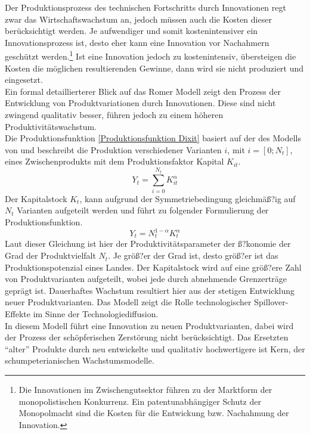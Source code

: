 Der Produktionsprozess des technischen Fortschritts durch Innovationen regt zwar das Wirtschaftswachstum an, jedoch müssen auch die Kosten dieser berücksichtigt werden. Je aufwendiger und somit kostenintensiver ein Innovationsprozess ist, desto eher kann eine Innovation vor Nachahmern geschützt werden.\footnote{Die Innovationen im Zwischengutsektor führen zu der Marktform der monopolistischen Konkurrenz. Ein patentunabhängiger Schutz der Monopolmacht sind die Kosten für die Entwickung bzw. Nachahmung der Innovation.} Ist eine Innovation jedoch zu kostenintensiv, übersteigen die Kosten die möglichen resultierenden Gewinne, dann wird sie nicht produziert und eingesetzt. \\ Ein formal detaillierterer Blick auf das Romer Modell zeigt den Prozess der Entwicklung von Produktvariationen durch Innovationen. Diese sind nicht zwingend qualitativ besser, führen jedoch zu einem höheren Produktivitätswachstum. \\ Die Produktionsfunktion \eqref{Produktionsfunktion Dixit} basiert auf der des Modells von \cite{Dixit.1977} und beschreibt die Produktion verschiedener Varianten $i$, mit $i=[0;N_t]$, eines Zwischenprodukts mit dem Produktionsfaktor Kapital $K_{it}$.
%
	\begin{equation}
		Y_t= \sum_{i=0}^{N_t} K_{it}^\alpha 
	\end{equation}\label{Produktionsfunktion Dixit}
%
Der Kapitalstock $K_t$, kann aufgrund der Symmetriebedingung gleichmäß?ig auf $N_t$ Varianten aufgeteilt werden und führt zu folgender Formulierung der Produktionsfunktion.
%
	\begin{equation}
		Y_t=N_t^{1-\alpha}K_t^\alpha
	\end{equation}
%
Laut dieser Gleichung ist hier der Produktivitätsparameter der ß?konomie der Grad der Produktvielfalt $N_t$. Je größ?er der Grad ist, desto größ?er ist das Produktionspotenzial eines Landes. Der Kapitalstock wird auf eine größ?ere Zahl von Produktvarianten aufgeteilt, wobei jede durch abnehmende Grenzerträge geprägt ist. Dauerhaftes Wachstum resultiert hier aus der stetigen Entwicklung neuer Produktvarianten. Das Modell zeigt die Rolle technologischer Spillover-Effekte im Sinne der Technologiediffusion.\\
%
In diesem Modell führt eine Innovation zu neuen Produktvarianten, dabei wird der Prozess der schöpferischen Zerstörung nicht berücksichtigt. Das Ersetzten "`alter"' Produkte durch neu entwickelte und qualitativ hochwertigere ist Kern, der schumpeterianischen Wachstumsmodelle.
%
